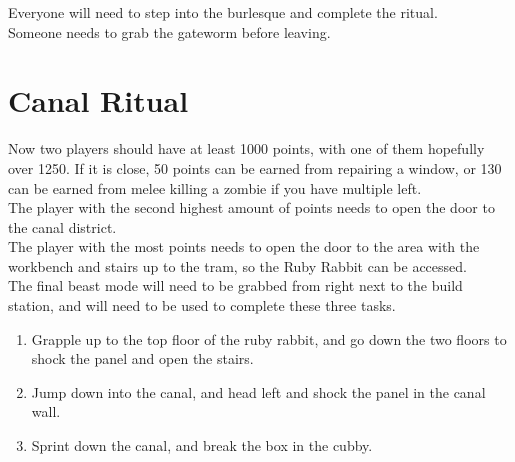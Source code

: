 \documentclass[11pt]{article} %
\begin{document}
	Everyone will need to step into the burlesque and complete the ritual. \\

	Someone needs to grab the gateworm before leaving.

\newpage
\section{Canal Ritual}
	
	Now two players should have at least 1000 points, with one of them hopefully over 1250. If it is close, 50 points can be earned from repairing a window, or 130 can be earned from melee killing a zombie if you have multiple left. \\

	The player with the second highest amount of points needs to open the door to the canal district. \\

	The player with the most points needs to open the door to the area with the workbench and stairs up to the tram, so the Ruby Rabbit can be accessed. \\

	The final beast mode will need to be grabbed from right next to the build station, and will need to be used to complete these three tasks.

	\begin{enumerate}
		\item Grapple up to the top floor of the ruby rabbit, and go down the two floors to shock the panel and open the stairs.
		\item Jump down into the canal, and head left and shock the panel in the canal wall.
		\item Sprint down the canal, and break the box in the cubby.
	\end{enumerate}
\end{document}
